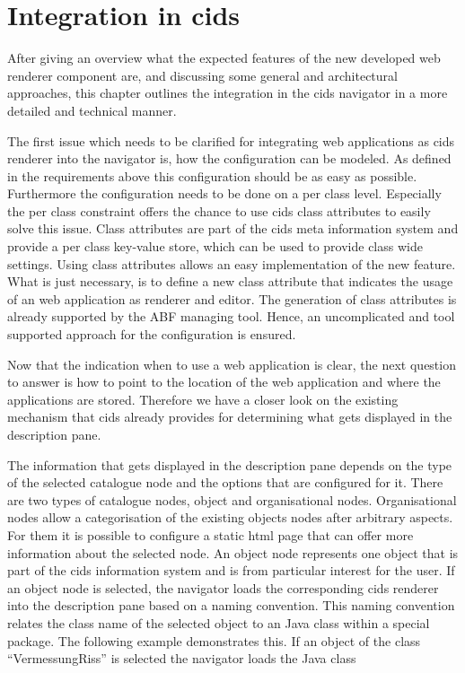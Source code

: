 \section{Integration in cids}

After giving an overview what the expected features of the new developed web renderer component are, and discussing some general and architectural approaches, this chapter outlines the integration in the cids navigator in a more detailed and technical manner.

The first issue which needs to be clarified for integrating web applications as cids renderer into the navigator is, how the configuration can be modeled.
As defined in the requirements above this configuration should be as easy as possible.
Furthermore the configuration needs to be done on a per class level.
Especially the per class constraint offers the chance to use cids class attributes to easily solve this issue.
Class attributes are part of the cids meta information system and provide a per class key-value store, which can be used to provide class wide settings.
Using class attributes allows an easy implementation of the new feature.
What is just necessary, is to define a new class attribute that indicates the usage of an web application as renderer and editor.
The generation of class attributes is already supported by the ABF managing tool.
Hence, an uncomplicated and tool supported approach for the configuration is ensured.

Now that the indication when to use a web application is clear, the next question to answer is how to point to the location of the web application and where the applications are stored. Therefore we have a closer look on the existing mechanism that cids already provides for determining what gets displayed in the description pane.

The information that gets displayed in the description pane depends on the type of the selected catalogue node and the options that are configured for it.
There are two types of catalogue nodes, object and organisational nodes. Organisational nodes allow a categorisation of the existing objects nodes after arbitrary aspects.
For them it is possible to configure a static html page that can offer more information about the selected node.
An object node represents one object that is part of the cids information system and is from particular interest for the user.
 If an object node is selected, the navigator loads the corresponding cids  renderer into the description pane based on a naming convention.
This naming convention relates the class name of the selected object to an Java class within a special package. 
The following example demonstrates this. If an object of the class \enquote{VermessungRiss} is selected the navigator loads the Java class 

